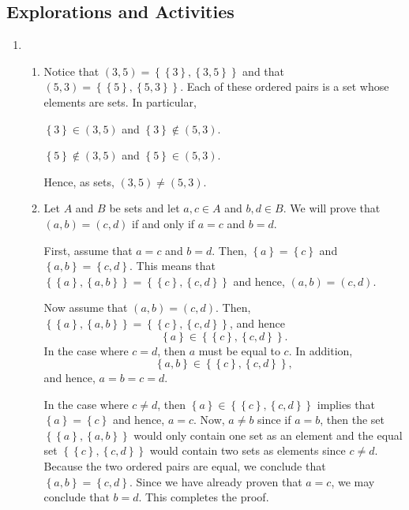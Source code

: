 \subsection*{Explorations and Activities}
\setcounter{oldenumi}{\theenumi}
\begin{enumerate} \setcounter{enumi}{\theoldenumi}
\item \begin{enumerate}
\item Notice that $\left( {3, 5} \right) = \left\{ {\left\{ 3 \right\},\left\{ {3, 5} \right\}} \right\}$ and that  $\left( {5, 3} \right) = \left\{ {\left\{ 5 \right\},\left\{ {5, 3} \right\}} \right\}$.  Each of these ordered pairs is a set whose elements are sets.  In particular,
\begin{center}
$\left\{ 3 \right\} \in \left( {3, 5} \right)$ and 
$\left\{ 3 \right\} \notin \left( {5, 3} \right)$.

$\left\{ 5 \right\} \notin \left( {3, 5} \right)$ and 
$\left\{ 5 \right\} \in \left( {5, 3} \right)$.
\end{center}
Hence, as sets, $\left( {3, 5} \right) \ne \left( {5, 3} \right)$.

\item Let  $A$  and  $B$  be sets and let  $a,c \in A$  and  $b,d \in B$.  We will prove that  $\left( {a,b} \right) = \left( {c,d} \right)$  if and only if  $a = c$ and $b = d$.

First, assume that $a = c$ and $b = d$.  Then, $\left\{ a \right\} = \left\{ c \right\}$ and 
$\left\{ a, b \right\} = \left\{ c, d \right\}$.  This means that 
$\left\{ {\left\{ a \right\},\left\{ {a, b} \right\}} \right\} = 
\left\{ {\left\{ c \right\},\left\{ {c, d} \right\}} \right\}$ and hence, 
$\left( {a,b} \right) = \left( {c,d} \right)$.

Now assume that $\left( {a,b} \right) = \left( {c,d} \right)$.  Then, 
$\left\{ {\left\{ a \right\},\left\{ {a, b} \right\}} \right\} = 
\left\{ {\left\{ c \right\},\left\{ {c, d} \right\}} \right\}$, and hence
\[
\left\{ a \right\} \in \left\{ {\left\{ c \right\},\left\{ {c, d} \right\}} \right\}.
\]
In the case where $c = d$, then  $a$ must be equal to $c$. In addition,
\[
\left\{ a, b \right\} \in \left\{ {\left\{ c \right\},\left\{ {c, d} \right\}} \right\},
\]
and hence, $a = b = c = d$.  

In the case where $c \ne d$, then 
$\left\{ a \right\} \in \left\{ {\left\{ c \right\},\left\{ {c, d} \right\}} \right\}$ implies that $\left\{ a \right\} = \left\{ c \right\}$ and hence, $a = c$.  Now, $a \ne b$ since if 
$a = b$, then the set $\left\{ {\left\{ a \right\},\left\{ {a, b} \right\}} \right\}$ would only contain one set as an element and the equal set 
$\left\{ {\left\{ c \right\},\left\{ {c, d} \right\}} \right\}$ would contain two sets as elements since $c \ne d$.  Because the two ordered pairs are equal, we conclude that 
$\left\{ a, b \right\} = \left\{ c, d \right\}$.  Since we have already proven that $a = c$, we may conclude that $b = d$.  This completes the proof.


\end{enumerate}
\end{enumerate}
